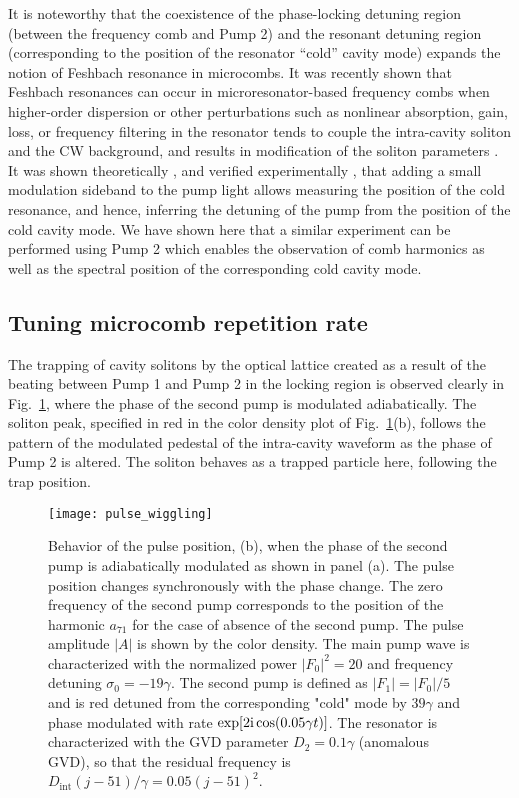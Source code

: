 It is noteworthy that the coexistence of the phase-locking detuning region (between the frequency comb and Pump 2) and the resonant detuning region (corresponding to the position of the resonator ``cold'' cavity mode) expands the notion of Feshbach resonance in microcombs. It was recently shown that Feshbach resonances can occur in microresonator-based frequency combs when higher-order dispersion or other perturbations such as nonlinear absorption, gain, loss, or frequency filtering in the resonator tends to couple the intra-cavity soliton and the CW background, and results in modification of the soliton parameters \cite{matsko2015noise, matsko2015feshbach}. It was shown theoretically \cite{matsko2015feshbach}, and verified experimentally \cite{guo2016universal}, that adding a small modulation sideband to the pump light allows measuring the position of the cold resonance, and hence, inferring the detuning of the pump from the position of the cold cavity mode. We have shown here that a similar experiment can be performed using Pump 2 which enables the observation of comb harmonics as well as the spectral position of the corresponding cold cavity mode.

\subsection{Tuning microcomb repetition rate}

The trapping of cavity solitons by the optical lattice created as a result of the beating between Pump 1 and Pump 2 in the locking region is observed clearly in Fig.~\ref{fig:wiggling}, where the phase of the second pump is modulated adiabatically. The soliton peak, specified in red in the color density plot of Fig.~\ref{fig:wiggling}(b), follows the pattern of the modulated pedestal of the intra-cavity waveform as the phase of Pump 2 is altered. The soliton behaves as a trapped particle here, following the trap position.
%
\begin{figure}[tbp]
  \centering
  \texttt{[image: pulse\_wiggling]}
\caption{ \small Behavior of the pulse position, (b), when the phase of the second pump is adiabatically modulated as shown in panel (a). The pulse position changes synchronously with the phase change. The zero frequency of the second pump corresponds to the position of the harmonic $a_{71}$ for the case of absence of the second pump.  The pulse amplitude $|A|$ is shown by the color density.  The main pump wave is characterized with the normalized power $|F_0|^2=20$ and frequency detuning $\sigma_0=-19 \gamma$. The second pump is defined as $|F_1|=|F_0|/5$ and is red detuned from the corresponding "cold" mode by $39\gamma$ and phase modulated with rate $\exp [2\mathrm{i}\cos(0.05\gamma t)]$. The resonator is characterized with the GVD parameter $D_2=0.1\gamma$ (anomalous GVD), so that the residual frequency is $D_\mathrm{int}(j - 51)/\gamma=0.05(j - 51)^2$.
} \label{fig:wiggling}
\end{figure}
%

